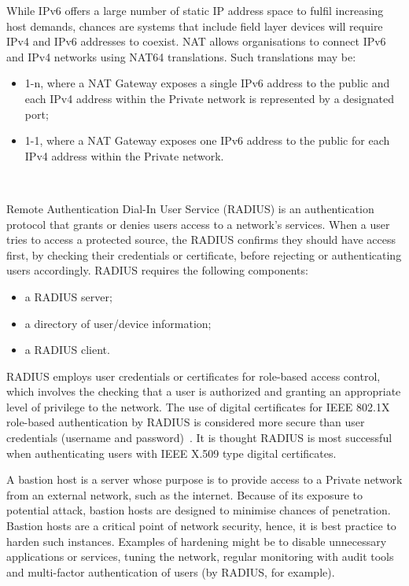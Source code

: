 \documentclass[11pt, oneside]{book}   	%
\begin{document}
While IPv6 offers a large number of static IP address space to fulfil increasing host demands, chances are systems that include field layer devices will require IPv4 and IPv6 addresses to coexist.
NAT allows organisations to connect IPv6 and IPv4 networks using NAT64 translations. Such translations may be:
\begin{itemize}
	\item 1-n, where a NAT Gateway exposes a single IPv6 address to the public and each IPv4 address within the Private network is represented by a designated port; 
	\item 1-1, where a NAT Gateway exposes one IPv6 address to the public for each IPv4 address within the Private network.
\end{itemize}\

Remote Authentication Dial-In User Service (RADIUS) is an authentication protocol that grants or denies users access to a network’s services.
When a user tries to access a protected source, the RADIUS confirms they should have access first, by checking their credentials or certificate, before rejecting or authenticating users accordingly.
RADIUS requires the following components:
\begin{itemize}
	\item a RADIUS server; 
	\item a directory of user/device information;
	\item a RADIUS client.
\end{itemize}	
RADIUS employs user credentials or certificates for role-based access control, which involves the checking that a user is authorized and granting an appropriate level of privilege to the network.
The use of digital certificates for IEEE 802.1X role-based authentication by RADIUS is considered more secure than user credentials (username and password)~\cite{8021X}.
It is thought RADIUS is most successful when authenticating users with IEEE X.509 type digital certificates.~\cite{X509}\

A bastion host is a server whose purpose is to provide access to a Private network from an external network, such as the internet.
Because of its exposure to potential attack, bastion hosts are designed to minimise chances of penetration.
Bastion hosts are a critical point of network security, hence, it is best practice to harden such instances.
Examples of hardening might be to disable unnecessary applications or services, tuning the network, regular monitoring with audit tools and multi-factor authentication of users (by RADIUS, for example).\
\end{document}

